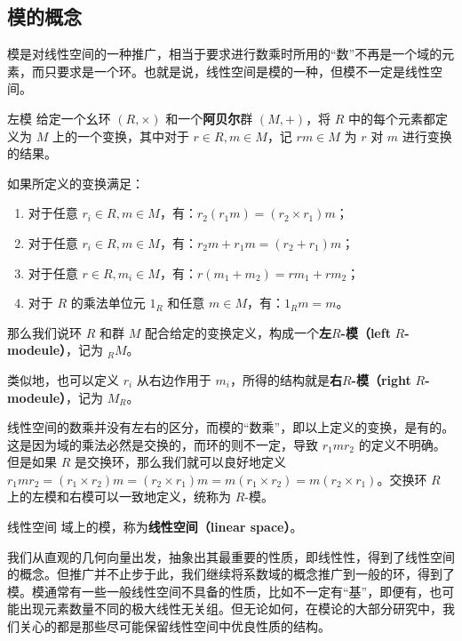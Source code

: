 



\subsection{模的概念}


模是对线性空间的一种推广，相当于要求进行数乘时所用的“数”不再是一个域的元素，而只要求是一个环。也就是说，线性空间是模的一种，但模不一定是线性空间。

\begin{definition}{左模}
给定一个幺环 $(R, \times)$ 和一个\textbf{阿贝尔}群 $(M, +)$，将 $R$ 中的每个元素都定义为 $M$ 上的一个变换，其中对于 $r\in R, m\in M$，记 $rm\in M$ 为 $r$ 对 $m$ 进行变换的结果。

如果所定义的变换满足：
\begin{enumerate}
\item 对于任意 $r_i\in R, m\in M$，有：$r_2(r_1m)=(r_2\times r_1)m$；
\item 对于任意 $r_i\in R, m\in M$，有：$r_2m+r_1m=(r_2+r_1)m$；
\item 对于任意 $r\in R, m_i\in M$，有：$r(m_1+m_2)=rm_1+rm_2$；
\item 对于 $R$ 的乘法单位元 $1_R$ 和任意 $m\in M$，有：$1_Rm=m$。
\end{enumerate}

那么我们说环 $R$ 和群 $M$ 配合给定的变换定义，构成一个\textbf{左}$R$\textbf{-模（left} $R$\textbf{-modeule）}，记为 $_RM$。
\end{definition}

类似地，也可以定义 $r_i$ 从右边作用于 $m_i$，所得的结构就是\textbf{右}$R$\textbf{-模（right} $R$\textbf{-modeule）}，记为 $M_R$。

线性空间的数乘并没有左右的区分，而模的“数乘”，即以上定义的变换，是有的。这是因为域的乘法必然是交换的，而环的则不一定，导致 $r_1mr_2$ 的定义不明确。但是如果 $R$ 是交换环，那么我们就可以良好地定义 $r_1mr_2=(r_1\times r_2)m=(r_2\times r_1)m=m(r_1\times r_2)=m(r_2\times r_1)$。交换环 $R$ 上的左模和右模可以一致地定义，统称为 $R$-模。

\begin{definition}{线性空间}
域上的模，称为\textbf{线性空间（linear space）}。
\end{definition}


我们从直观的几何向量出发，抽象出其最重要的性质，即线性性，得到了线性空间的概念。但推广并不止步于此，我们继续将系数域的概念推广到一般的环，得到了模。模通常有一些一般线性空间不具备的性质，比如不一定有“基”，即便有，也可能出现元素数量不同的极大线性无关组。但无论如何，在模论的大部分研究中，我们关心的都是那些尽可能保留线性空间中优良性质的结构。


